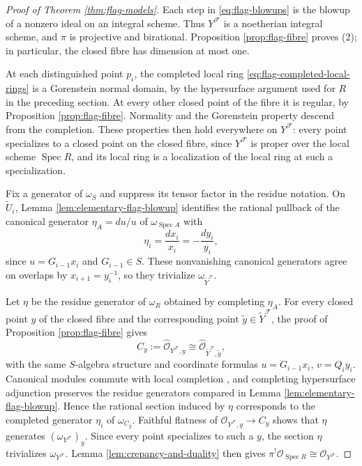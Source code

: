 \documentclass[a4paper,reqno]{amsart}
\def\F{\mathcal{F}}
\def\O{\mathcal{O}}
\DeclareMathOperator{\Spec}{Spec}
\theoremstyle{definition}
\begin{document}
\begin{proof}[Proof of Theorem \ref{thm:flag-models}]
Each step in \eqref{eq:flag-blowups} is the blowup of a nonzero ideal on an integral scheme. Thus $Y^\F$ is a noetherian integral scheme, and $\pi$ is projective and birational. Proposition \ref{prop:flag-fibre} proves (2); in particular, the closed fibre has dimension at most one.

At each distinguished point $p_i$, the completed local ring \eqref{eq:flag-completed-local-rings} is a Gorenstein normal domain, by the hypersurface argument used for $R$ in the preceding section. At every other closed point of the fibre it is regular, by Proposition \ref{prop:flag-fibre}. Normality and the Gorenstein property descend from the completion. These properties then hold everywhere on $Y^\F$: every point specializes to a closed point on the closed fibre, since $Y^\F$ is proper over the local scheme $\Spec R$, and its local ring is a localization of the local ring at such a specialization.

Fix a generator of $\omega_S$ and suppress its tensor factor in the residue notation. On $\widetilde U_i$, Lemma \ref{lem:elementary-flag-blowup} identifies the rational pullback of the canonical generator $\eta_A=du/u$ of $\omega_{\Spec A}$ with
\[
\eta_i=\frac{dx_i}{x_i}=-\frac{dy_i}{y_i},
\]
since $u=G_{i-1}x_i$ and $G_{i-1}\in S$. These nonvanishing canonical generators agree on overlaps by $x_{i+1}=y_i^{-1}$, so they trivialize $\omega_{\widetilde Y^\F}$.

Let $\eta$ be the residue generator of $\omega_R$ obtained by completing $\eta_A$. For every closed point $y$ of the closed fibre and the corresponding point $\widetilde y\in\widetilde Y^\F$, the proof of Proposition \ref{prop:flag-fibre} gives
\[
C_y:=\widehat{\O}_{Y^\F,y}
\cong\widehat{\O}_{\widetilde Y^\F,\widetilde y},
\]
with the same $S$-algebra structure and coordinate formulas $u=G_{i-1}x_i$, $v=Q_iy_i$. Canonical modules commute with local completion \cite[Tag 0AWD]{stacks-project}, and completing hypersurface adjunction preserves the residue generators compared in Lemma \ref{lem:elementary-flag-blowup}. Hence the rational section induced by $\eta$ corresponds to the completed generator $\eta_i$ of $\omega_{C_y}$. Faithful flatness of $\O_{Y^\F,y}\to C_y$ shows that $\eta$ generates $(\omega_{Y^\F})_y$. Since every point specializes to such a $y$, the section $\eta$ trivializes $\omega_{Y^\F}$. Lemma \ref{lem:crepancy-and-duality} then gives $\pi^!\O_{\Spec R}\cong\O_{Y^\F}$.


\end{proof}
\end{document}
